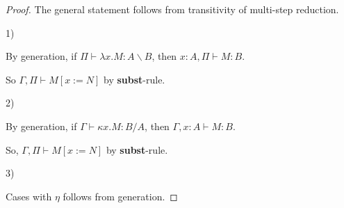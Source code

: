\documentclass[a4paper]{article}
\begin{document}
\begin{proof}

The general statement follows from transitivity of multi-step reduction.

1)

\begin{prooftree}
\end{prooftree}

By generation, if $\Pi \vdash \lambda x.M : A \backslash B$, then $x : A, \Pi \vdash M : B$.

So $\Gamma, \Pi \vdash M [x := N]$ by {\bf subst}-rule.

\vspace{\baselineskip}

2)

\begin{prooftree}
\end{prooftree}

By generation, if $\Gamma \vdash \kappa x. M : B / A$, then $\Gamma, x : A \vdash M : B$.

So, $\Gamma, \Pi \vdash M [x := N]$ by {\bf subst}-rule.

\vspace{\baselineskip}

3)

\begin{prooftree}
\end{prooftree}

\begin{prooftree}
\end{prooftree}

\vspace{\baselineskip}

Cases with $\eta$ follows from generation.

\end{proof}
\end{document}
